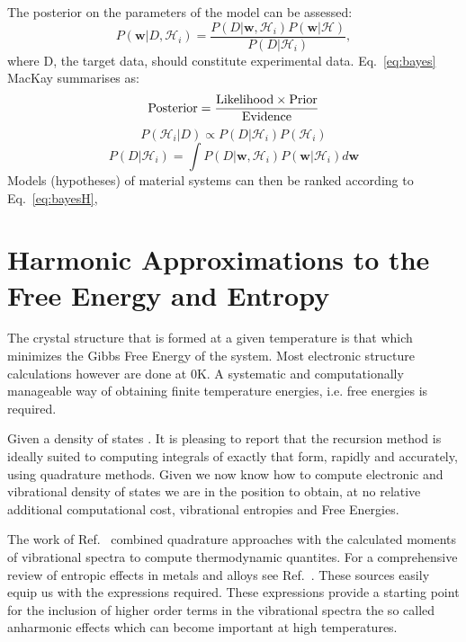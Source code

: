 The posterior on the parameters of the model can be assessed:
%
\begin{equation}
\label{eq:bayes}
P(\mathbf{w}|D, \mathcal{H}_{i}) = 
\frac{P(D|\mathbf{w}, \mathcal{H}_{i})P(\mathbf{w}|\mathcal{H})}{P(D|\mathcal{H}_{i})},
\end{equation}
%
where D, the target data, should constitute experimental data. 
Eq.~\ref{eq:bayes} MacKay summarises as:
%
\begin{equation}
{\rm Posterior} = \frac{{\rm Likelihood} \times {\rm Prior}}{{\rm Evidence}}
\end{equation}
%
\begin{equation}
\label{eq:bayesH}
P(\mathcal{H}_{i}|D) \propto P(D|\mathcal{H}_{i})P(\mathcal{H}_{i})
\end{equation}
%
\begin{equation}
\label{eq:bayesH}
P(D|\mathcal{H}_{i}) = \int P(D|\mathbf{w}, \mathcal{H}_{i})P(\mathbf{w}|\mathcal{H}_{i})d\mathbf{w}
\end{equation}
%
Models (hypotheses) of material systems can then be ranked according to Eq.~\ref{eq:bayesH},  

\section{Harmonic Approximations to the Free Energy and Entropy}
The crystal structure that is formed at a given temperature is that which
minimizes the Gibbs Free Energy of the system. Most electronic structure calculations
however are done at 0K. A systematic and computationally manageable way of obtaining
finite temperature energies, i.e. free energies is required.

Given a density of states . It is pleasing to report that the recursion method
is ideally suited to computing integrals of exactly that form, rapidly and accurately,
using quadrature methods. Given we now know how to compute electronic and 
vibrational density of states we are in the position to obtain, at no relative additional 
computational cost, vibrational entropies and Free Energies.

The work of Ref.~\cite{wheeler68} combined quadrature approaches
with the calculated moments of vibrational spectra to compute
thermodynamic quantites. For a comprehensive review
of entropic effects in metals and alloys see Ref.~\cite{fultz10}. 
These sources easily equip us with the expressions required. These expressions provide a starting
point for the inclusion of higher order terms in the vibrational spectra
the so called anharmonic effects which can become important at high temperatures.
